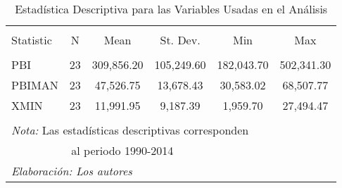 \documentclass[11pt,]{article}
\begin{document}
\begin{table}[!htbp] \centering 
  \caption{Estadística Descriptiva para las Variables Usadas en el Análisis} 
  \label{tab:descript} 
\small 
\begin{tabular}{@{\extracolsep{5pt}}lccccc} 
\\[-1.8ex]\hline \\[-1.8ex] 
Statistic & \multicolumn{1}{c}{N} & \multicolumn{1}{c}{Mean} & \multicolumn{1}{c}{St. Dev.} & \multicolumn{1}{c}{Min} & \multicolumn{1}{c}{Max} \\ 
\hline 
\hline \\[-1.8ex] 
PBI & 23 & 309,856.20 & 105,249.60 & 182,043.70 & 502,341.30 \\ 
PBIMAN & 23 & 47,526.75 & 13,678.43 & 30,583.02 & 68,507.77 \\ 
XMIN & 23 & 11,991.95 & 9,187.39 & 1,959.70 & 27,494.47 \\ 
\hline 
\hline \\[-1.8ex] 
\multicolumn{6}{l}{\footnotesize{\textit{Nota:} Las estadísticas descriptivas corresponden}} \\ 
\multicolumn{6}{l}{\footnotesize{~~~~~~~~~~ al periodo 1990-2014}} \\ 
\multicolumn{6}{l}{\footnotesize{\textit{Elaboración: Los autores}}} \\ 
\end{tabular} 
\end{table}
\end{document}
